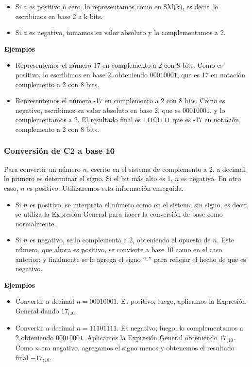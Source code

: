 \documentclass[spanish,a4paper,]{article}
\providecommand{\tightlist}{%
  \setlength{\itemsep}{0pt}\setlength{\parskip}{0pt}}
\begin{document}
\begin{itemize}
\tightlist
\item
  Si \(a\) es positivo o cero, lo representamos como en SM(k), es decir,
  lo escribimos en base 2 a k bits.
\item
  Si \(a\) es negativo, tomamos su valor absoluto y lo complementamos a
  2.
\end{itemize}

\textbf{Ejemplos}

\begin{itemize}
\tightlist
\item
  Representemos el número 17 en complemento a 2 con 8 bits. Como es
  positivo, lo escribimos en base 2, obteniendo \(00010001\), que es 17
  en notación complemento a 2 con 8 bits.
\item
  Representemos el número -17 en complemento a 2 con 8 bits. Como es
  negativo, escribimos su valor absoluto en base 2, que es \(00010001\),
  y lo complementamos a 2. El resultado final es \(11101111\) que es -17
  en notación complemento a 2 con 8 bits.
\end{itemize}

\hypertarget{conversiuxf3n-de-c2-a-base-10}{%
\subsubsection{Conversión de C2 a base
10}\label{conversiuxf3n-de-c2-a-base-10}}

Para convertir un número \(n\), escrito en el sistema de complemento a
2, a decimal, lo primero es determinar el signo. Si el bit más alto es
1, \(n\) es negativo. En otro caso, \(n\) es positivo. Utilizaremos esta
información enseguida.

\begin{itemize}
\tightlist
\item
  Si \(n\) es positivo, se interpreta el número como en el sistema sin
  signo, es decir, se utiliza la Expresión General para hacer la
  conversión de base como normalmente.
\item
  Si \(n\) es negativo, se lo complementa a 2, obteniendo el opuesto de
  \(n\). Este número, que ahora es positivo, se convierte a base 10 como
  en el caso anterior; y finalmente se le agrega el signo ``-'' para
  reflejar el hecho de que es negativo.
\end{itemize}

\textbf{Ejemplos}

\begin{itemize}
\tightlist
\item
  Convertir a decimal \(n = 00010001\). Es positivo, luego, aplicamos la
  Expresión General dando \(17_{(10}\).
\item
  Convertir a decimal \(n = 11101111\). Es negativo; luego, lo
  complementamos a 2 obteniendo \(00010001\). Aplicamos la Expresión
  General obteniendo \(17_{(10}\). Como \(n\) era negativo, agregamos el
  signo menos y obtenemos el resultado final \(-17_{(10}\).
\end{itemize}
\end{document}
